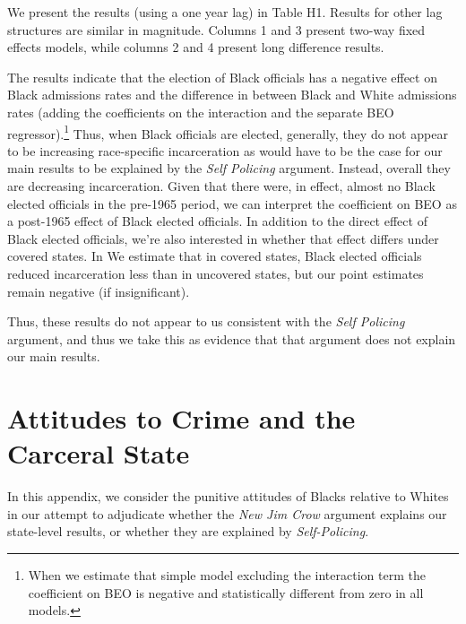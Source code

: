 \documentclass[12pt]{article}
\begin{document}
We present the results (using a one year lag) in Table H1.  Results for other lag structures are similar in magnitude. Columns 1 and 3 present two-way fixed effects models, while columns 2 and 4 present long difference results.

The results indicate that the election of Black officials has a negative effect on Black admissions rates and the difference in between Black and White admissions rates (adding the coefficients on the interaction and the separate BEO regressor).\footnote{When we estimate that simple model excluding the interaction term the coefficient on BEO is negative and statistically different from zero in all models. }  Thus, when Black officials are elected, generally, they do not appear to be increasing race-specific incarceration as would have to be the case for our main results to be explained by the \emph{Self Policing} argument.  Instead, overall they are decreasing incarceration.  Given that there were, in effect, almost no Black elected officials in the pre-1965 period, we can interpret the coefficient on BEO as a post-1965 effect of Black elected officials. In addition to the direct effect of Black elected officials, we're also interested in whether that effect differs under covered states.  In We estimate that in covered states, Black elected officials reduced incarceration less than in uncovered states, but our point estimates remain negative (if insignificant).

Thus, these results do not appear to us consistent with the \emph{Self Policing} argument, and thus we take this as evidence that that argument does not explain our main results.







\section{Attitudes to Crime and the Carceral State}\label{appendix_attitudes}
\setcounter{table}{0}
\setcounter{figure}{0}
\renewcommand{\thetable}{I\arabic{table}}
\renewcommand{\thefigure}{I\arabic{figure}}
\normalsize

In this appendix, we consider the punitive attitudes of Blacks relative to Whites in our attempt to adjudicate whether the \emph{New Jim Crow} argument explains our state-level results, or whether they are explained by \emph{Self-Policing}.
\end{document}
